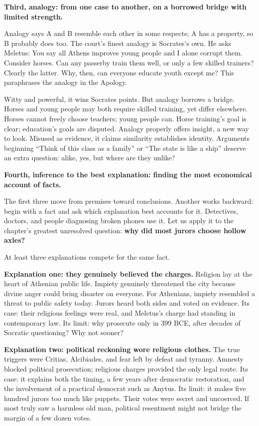 \textbf{Third, analogy: from one case to another, on a borrowed bridge with limited strength.}

Analogy says A and B resemble each other in some respects; A has a property, so B probably does too. The court's finest analogy is Socrates's own. He asks Meletus: You say all Athens improves young people and I alone corrupt them. Consider horses. Can any passerby train them well, or only a few skilled trainers? Clearly the latter. Why, then, can everyone educate youth except me? This paraphrases the analogy in the Apology.

Witty and powerful, it wins Socrates points. But analogy borrows a bridge. Horses and young people may both require skilled training, yet differ elsewhere. Horses cannot freely choose teachers; young people can. Horse training's goal is clear; education's goals are disputed. Analogy properly offers insight, a new way to look. Misused as evidence, it claims similarity establishes identity. Arguments beginning ``Think of this class as a family'' or ``The state is like a ship'' deserve an extra question: alike, yes, but where are they unlike?

\textbf{Fourth, inference to the best explanation: finding the most economical account of facts.}

The first three move from premises toward conclusions. Another works backward: begin with a fact and ask which explanation best accounts for it. Detectives, doctors, and people diagnosing broken phones use it. Let us apply it to the chapter's greatest unresolved question: \textbf{why did most jurors choose hollow axles?}

At least three explanations compete for the same fact.

\textbf{Explanation one: they genuinely believed the charges.} Religion lay at the heart of Athenian public life. Impiety genuinely threatened the city because divine anger could bring disaster on everyone. For Athenians, impiety resembled a threat to public safety today. Jurors heard both sides and voted on evidence. Its case: their religious feelings were real, and Meletus's charge had standing in contemporary law. Its limit: why prosecute only in 399 BCE, after decades of Socratic questioning? Why not sooner?

\textbf{Explanation two: political reckoning wore religious clothes.} The true triggers were Critias, Alcibiades, and fear left by defeat and tyranny. Amnesty blocked political prosecution; religious charges provided the only legal route. Its case: it explains both the timing, a few years after democratic restoration, and the involvement of a practical democrat such as Anytus. Its limit: it makes five hundred jurors too much like puppets. Their votes were secret and uncoerced. If most truly saw a harmless old man, political resentment might not bridge the margin of a few dozen votes.

